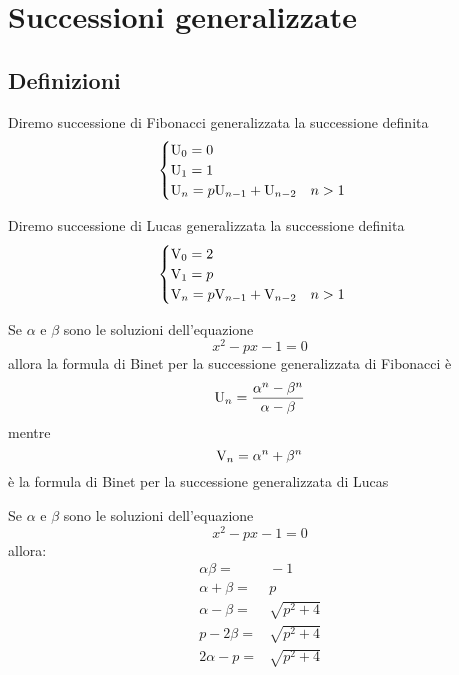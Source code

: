 \chapter{Successioni generalizzate}
\section{Definizioni}
\begin{defn}
	Diremo successione di Fibonacci generalizzata la successione definita
	\begin{equation}
		\begin{cases}
			\mathrm{U}_{0}=0\\
			\mathrm{U}_{1}=1\\
			\mathrm{U}_{n}=p\mathrm{U}_{n-1}+\mathrm{U}_{n-2}\quad n>1\\
		\end{cases}
	\end{equation} 
\end{defn}\cite{Yalciner2013}
\begin{defn}
Diremo successione di Lucas generalizzata la successione definita
\begin{equation}
	\begin{cases}
		\mathrm{V}_{0}=2\\
		\mathrm{V}_{1}=p\\
		\mathrm{V}_{n}=p\mathrm{V}_{n-1}+\mathrm{V}_{n-2}\quad n>1\\
	\end{cases}
\end{equation}
\end{defn}\cite{Yalciner2013} 
\begin{thm}
	Se $\alpha$ e $\beta$ sono le soluzioni dell'equazione \begin{equation}
		x^2-px-1=0
	\end{equation} allora la formula di Binet per la successione
 generalizzata 
	di Fibonacci è \begin{equation}
	\mathrm{U}_{n}=\dfrac{\alpha^n-\beta^n}{\alpha-\beta}
\end{equation}
mentre \begin{equation}
	\mathrm{V}_{n}=\alpha^n+\beta^n
\end{equation}
è la formula di Binet per la successione generalizzata di Lucas 
\end{thm}\cite{Yalciner2013} 
\begin{lem}[Proprietà]
	Se $\alpha$ e $\beta$ sono le soluzioni dell'equazione \begin{equation}
	x^2-px-1=0
\end{equation} allora:
\begin{align*}
	\alpha\beta=&{}-1\\
	\alpha+\beta=&{}p\\
	\alpha-\beta=&{}\sqrt{p^2+4}\\
	p-2\beta=&{}\sqrt{p^2+4}\\
	2\alpha-p =&{}\sqrt{p^2+4}\\
\end{align*}
\end{lem}